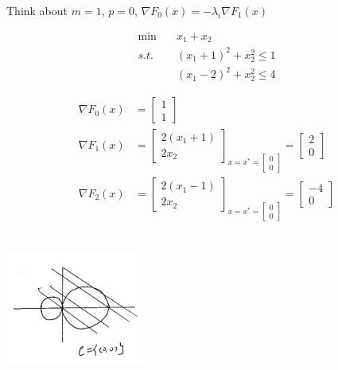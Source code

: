 Think about $m=1$, $p=0$, $\nabla F_0(x)=-\lambda_i\nabla F_1(x)$

\begin{align*}
\min \quad & x_1+x_2\\
s.t. \quad & (x_1+1)^2 + x_2^2 \leq 1\\
&(x_1-2)^2 + x_2^2 \leq 4
\end{align*}

\begin{align*}
\nabla F_0(x) &=\begin{bmatrix}
1\\
1
\end{bmatrix}\\
\nabla F_1(x) &=\begin{bmatrix}
2(x_1+1)\\
2x_2
\end{bmatrix}_{x=x^*=\begin{bmatrix}
	0\\
	0
	\end{bmatrix}}=\begin{bmatrix}
2\\
0
\end{bmatrix}\\
\nabla F_2(x) &=\begin{bmatrix}
2(x_1-1)\\
2x_2
\end{bmatrix}_{x=x^*=\begin{bmatrix}
	0\\
	0
	\end{bmatrix}}=\begin{bmatrix}
-4\\
0
\end{bmatrix}\\
\end{align*}

\begin{marginfigure}
	\centering
	\includegraphics[width=1.8in,height=1.8in]{figures/ch10/figure1204_5.png}
\end{marginfigure}


